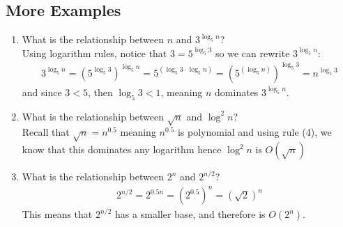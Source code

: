 \documentclass[14pt]{extarticle}
\begin{document}
    \subsection{More Examples}
    \begin{enumerate}
        \item What is the relationship between $n$ and $3^{\log_5 n}$?\\[2mm]
            Using logarithm rules, notice that $3 = 5^{\log_5 3}$ so
            we can rewrite $3^{\log_5 n}$:
            \begin{align*}
                3^{\log_5 n} 
                = \left(5^{\log_5 3}\right)^{\log_5 n}
                = 5^{\left(\log_5 3 \cdot \log_5 n\right)}
                = \left(5^{\left(\log_5 n\right)}\right)^{\log_5 3}
                = \boxed{n^{\log_5 3}}
            \end{align*}
        and since $3 < 5$, then $\log_5 3 < 1$, meaning $n$ dominates
        $3^{\log_5 n}$.
        
        \item What is the relationship between $\sqrt{n}$ and $\log^2 n$?\\[2mm]
            Recall that $\sqrt{n} = n^{0.5}$ meaning $n^{0.5}$ is polynomial
            and using rule (4), we know that this dominates any logarithm 
            hence $\log^2 n$ is $O\left(\sqrt{n}\right)$

        \item What is the relationship between $2^n$ and $2^{n/2}$?
            \begin{align*}
                2^{n/2} = 2^{0.5n} = \left(2^{0.5}\right)^n = 
                \left(\sqrt{2}\right)^n
            \end{align*}
            This means that $2^{n/2}$ has a smaller base, and therefore is
            $O\left(2^n\right)$.
    \end{enumerate}
\end{document}
